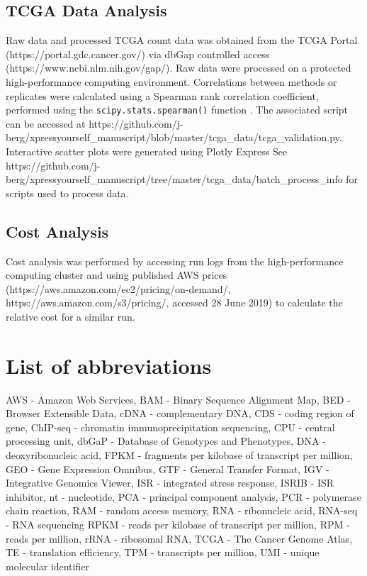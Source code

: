 \documentclass[10pt, oneside]{article}
\begin{document}
\subsection{TCGA Data Analysis}
Raw data and processed TCGA count data was obtained from the TCGA Portal (https://portal.gdc.cancer.gov/) via dbGap controlled access (https://www.ncbi.nlm.nih.gov/gap/). Raw data were processed on a protected high-performance computing environment. Correlations between methods or replicates were calculated using a Spearman rank correlation coefficient, performed using the \texttt{scipy.stats.spearman()} function \cite{spearman_rnaseq}. The associated script can be accessed at https://github.com/j-berg/xpressyourself\_manuscript/blob/master/tcga\_data/tcga\_validation.py. Interactive scatter plots were generated using Plotly Express \cite{plotly} See https://github.com/j-berg/xpressyourself\_manuscript/tree/master/tcga\_data/batch\_process\_info for scripts used to process data. \par


\subsection{Cost Analysis}
Cost analysis was performed by accessing run logs from the high-performance computing cluster and using published AWS prices (https://aws.amazon.com/ec2/pricing/on-demand/, https://aws.amazon.com/s3/pricing/, accessed 28 June 2019) to calculate the relative cost for a similar run.

\section*{List of abbreviations}
AWS - Amazon Web Services,
BAM - Binary Sequence Alignment Map,
BED - Browser Extensible Data,
cDNA - complementary DNA,
CDS - coding region of gene,
ChIP-seq - chromatin immunoprecipitation sequencing,
CPU - central processing unit,
dbGaP - Database of Genotypes and Phenotypes,
DNA - deoxyribonucleic acid,
FPKM - fragments per kilobase of transcript per million,
GEO - Gene Expression Omnibus,
GTF - General Transfer Format,
IGV - Integrative Genomics Viewer,
ISR - integrated stress response,
ISRIB - ISR inhibitor,
nt - nucleotide,
PCA - principal component analysis,
PCR - polymerase chain reaction,
RAM - random access memory,
RNA - ribonucleic acid,
RNA-seq - RNA sequencing
RPKM - reads per kilobase of transcript per million,
RPM - reads per million,
rRNA - ribosomal RNA,
TCGA - The Cancer Genome Atlas,
TE - translation efficiency,
TPM - transcripts per million,
UMI - unique molecular identifier
\end{document}
